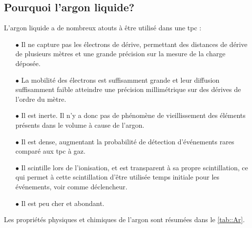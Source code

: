     \subsection{Pourquoi l'argon liquide?}
      L'argon liquide a de nombreux atouts à être utilisé dans une \gls{tpc}\cite{Rubbia1977} :
      \begin{itemize}
        \item[$\bullet$] Il ne capture pas les électrons de dérive, permettant des distances de dérive de plusieurs mètres et une grande précision sur la mesure de la charge déposée.
        \item[$\bullet$] La mobilité des électrons est suffisamment grande et leur diffusion suffisamment faible atteindre une précision millimétrique sur des dérives de l'ordre du mètre.
        \item[$\bullet$] Il est inerte. Il n'y a donc pas de phénomène de vieillissement des éléments présents dans le volume à cause de l'argon.
        \item[$\bullet$] Il est dense, augmentant la probabilité de détection d'événements rares comparé aux \gls{tpc} à gaz.
        \item[$\bullet$] Il scintille lors de l'ionisation, et est transparent à sa propre scintillation, ce qui permet à cette scintillation d'être utilisée temps initiale pour les événements, voir comme déclencheur.
        \item[$\bullet$] Il est peu cher et abondant.
      \end{itemize}
      Les propriétés physiques et chimiques de l'argon sont résumées dans le \autoref{tab::Ar}.
